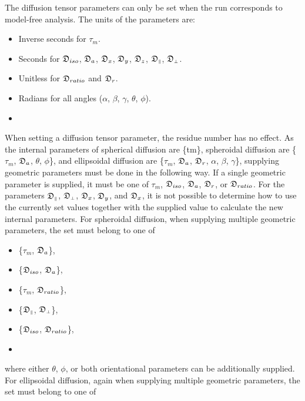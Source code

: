  The diffusion tensor parameters can only be set when the run corresponds to model-free analysis.  The units of the parameters are: 
  

 \begin{itemize} 
 \item[] Inverse seconds for $\tau_m$.  
 \item[] Seconds for $\mathfrak{D}_{iso}$, $\mathfrak{D}_a$, $\mathfrak{D}_x$, $\mathfrak{D}_y$, $\mathfrak{D}_z$, $\mathfrak{D}_{\scriptscriptstyle \parallel}$, $\mathfrak{D}_{\scriptscriptstyle \perp}$.  
 \item[] Unitless for $\mathfrak{D}_{ratio}$ and $\mathfrak{D}_r$.  
 \item[] Radians for all angles ($\alpha$, $\beta$, $\gamma$, $\theta$, $\phi$).  
 \item[]  
 \end{itemize} 
  

 When setting a diffusion tensor parameter, the residue number has no effect.  As the internal parameters of spherical diffusion are \{tm\}, spheroidal diffusion are \{$\tau_m$, $\mathfrak{D}_a$, $\theta$, $\phi$\}, and ellipsoidal diffusion are \{$\tau_m$, $\mathfrak{D}_a$, $\mathfrak{D}_r$, $\alpha$, $\beta$, $\gamma$\}, supplying geometric parameters must be done in the following way.  If a single geometric parameter is supplied, it must be one of $\tau_m$, $\mathfrak{D}_{iso}$, $\mathfrak{D}_a$, $\mathfrak{D}_r$, or $\mathfrak{D}_{ratio}$.  For the parameters $\mathfrak{D}_{\scriptscriptstyle \parallel}$, $\mathfrak{D}_{\scriptscriptstyle \perp}$, $\mathfrak{D}_x$, $\mathfrak{D}_y$, and $\mathfrak{D}_x$, it is not possible to determine how to use the currently set values together with the supplied value to calculate the new internal parameters.  For spheroidal diffusion, when supplying multiple geometric parameters, the set must belong to one of 
  

 \begin{itemize} 
 \item[] \{$\tau_m$, $\mathfrak{D}_a$\},  
 \item[] \{$\mathfrak{D}_{iso}$, $\mathfrak{D}_a$\},  
 \item[] \{$\tau_m$, $\mathfrak{D}_{ratio}$\},  
 \item[] \{$\mathfrak{D}_{\scriptscriptstyle \parallel}$, $\mathfrak{D}_{\scriptscriptstyle \perp}$\},  
 \item[] \{$\mathfrak{D}_{iso}$, $\mathfrak{D}_{ratio}$\},  
 \item[]  
 \end{itemize} 
  

 where either $\theta$, $\phi$, or both orientational parameters can be additionally supplied.  For ellipsoidal diffusion, again when supplying multiple geometric parameters, the set must belong to one of 
  


